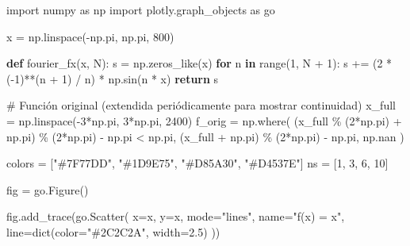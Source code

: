 \documentclass[
  letterpaper,
  DIV=11,
  numbers=noendperiod]{scrreprt}
\newenvironment{Shaded}{\begin{snugshade}}{\end{snugshade}}
\newcommand{\BuiltInTok}[1]{\textcolor[rgb]{0.00,0.23,0.31}{#1}}
\newcommand{\CommentTok}[1]{\textcolor[rgb]{0.37,0.37,0.37}{#1}}
\newcommand{\ControlFlowTok}[1]{\textcolor[rgb]{0.00,0.23,0.31}{\textbf{#1}}}
\newcommand{\DecValTok}[1]{\textcolor[rgb]{0.68,0.00,0.00}{#1}}
\newcommand{\FloatTok}[1]{\textcolor[rgb]{0.68,0.00,0.00}{#1}}
\newcommand{\ImportTok}[1]{\textcolor[rgb]{0.00,0.46,0.62}{#1}}
\newcommand{\KeywordTok}[1]{\textcolor[rgb]{0.00,0.23,0.31}{\textbf{#1}}}
\newcommand{\NormalTok}[1]{\textcolor[rgb]{0.00,0.23,0.31}{#1}}
\newcommand{\OperatorTok}[1]{\textcolor[rgb]{0.37,0.37,0.37}{#1}}
\newcommand{\StringTok}[1]{\textcolor[rgb]{0.13,0.47,0.30}{#1}}
\begin{document}
\begin{Shaded}
\begin{Highlighting}[]
\ImportTok{import}\NormalTok{ numpy }\ImportTok{as}\NormalTok{ np}
\ImportTok{import}\NormalTok{ plotly.graph\_objects }\ImportTok{as}\NormalTok{ go}

\NormalTok{x }\OperatorTok{=}\NormalTok{ np.linspace(}\OperatorTok{{-}}\NormalTok{np.pi, np.pi, }\DecValTok{800}\NormalTok{)}

\KeywordTok{def}\NormalTok{ fourier\_fx(x, N):}
\NormalTok{    s }\OperatorTok{=}\NormalTok{ np.zeros\_like(x)}
    \ControlFlowTok{for}\NormalTok{ n }\KeywordTok{in} \BuiltInTok{range}\NormalTok{(}\DecValTok{1}\NormalTok{, N }\OperatorTok{+} \DecValTok{1}\NormalTok{):}
\NormalTok{        s }\OperatorTok{+=}\NormalTok{ (}\DecValTok{2} \OperatorTok{*}\NormalTok{ (}\OperatorTok{{-}}\DecValTok{1}\NormalTok{)}\OperatorTok{**}\NormalTok{(n }\OperatorTok{+} \DecValTok{1}\NormalTok{) }\OperatorTok{/}\NormalTok{ n) }\OperatorTok{*}\NormalTok{ np.sin(n }\OperatorTok{*}\NormalTok{ x)}
    \ControlFlowTok{return}\NormalTok{ s}

\CommentTok{\# Función original (extendida periódicamente para mostrar continuidad)}
\NormalTok{x\_full }\OperatorTok{=}\NormalTok{ np.linspace(}\OperatorTok{{-}}\DecValTok{3}\OperatorTok{*}\NormalTok{np.pi, }\DecValTok{3}\OperatorTok{*}\NormalTok{np.pi, }\DecValTok{2400}\NormalTok{)}
\NormalTok{f\_orig }\OperatorTok{=}\NormalTok{ np.where(}
\NormalTok{    (x\_full }\OperatorTok{\%}\NormalTok{ (}\DecValTok{2}\OperatorTok{*}\NormalTok{np.pi) }\OperatorTok{+}\NormalTok{ np.pi) }\OperatorTok{\%}\NormalTok{ (}\DecValTok{2}\OperatorTok{*}\NormalTok{np.pi) }\OperatorTok{{-}}\NormalTok{ np.pi }\OperatorTok{\textless{}}\NormalTok{ np.pi,}
\NormalTok{    (x\_full }\OperatorTok{+}\NormalTok{ np.pi) }\OperatorTok{\%}\NormalTok{ (}\DecValTok{2}\OperatorTok{*}\NormalTok{np.pi) }\OperatorTok{{-}}\NormalTok{ np.pi,}
\NormalTok{    np.nan}
\NormalTok{)}

\NormalTok{colors  }\OperatorTok{=}\NormalTok{ [}\StringTok{"\#7F77DD"}\NormalTok{, }\StringTok{"\#1D9E75"}\NormalTok{, }\StringTok{"\#D85A30"}\NormalTok{, }\StringTok{"\#D4537E"}\NormalTok{]}
\NormalTok{ns      }\OperatorTok{=}\NormalTok{ [}\DecValTok{1}\NormalTok{, }\DecValTok{3}\NormalTok{, }\DecValTok{6}\NormalTok{, }\DecValTok{10}\NormalTok{]}

\NormalTok{fig }\OperatorTok{=}\NormalTok{ go.Figure()}

\NormalTok{fig.add\_trace(go.Scatter(}
\NormalTok{    x}\OperatorTok{=}\NormalTok{x, y}\OperatorTok{=}\NormalTok{x,}
\NormalTok{    mode}\OperatorTok{=}\StringTok{"lines"}\NormalTok{, name}\OperatorTok{=}\StringTok{"f(x) = x"}\NormalTok{,}
\NormalTok{    line}\OperatorTok{=}\BuiltInTok{dict}\NormalTok{(color}\OperatorTok{=}\StringTok{"\#2C2C2A"}\NormalTok{, width}\OperatorTok{=}\FloatTok{2.5}\NormalTok{)}
\NormalTok{))}


\end{Highlighting}
\end{Shaded}
\end{document}
